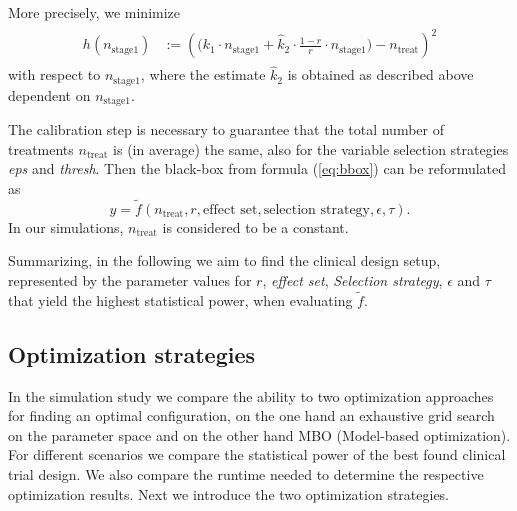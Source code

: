 \documentclass[bimj,fleqn]{w-art}
\theoremstyle{plain}
\theoremstyle{definition}
\begin{document}
More precisely, we minimize
\begin{align}
  \label{eq:targettreat}
  \begin{split}
  h(n_{\text{stage1}}) &:= \left( \Big(k_1 \cdot n_{\text{stage1}} + \hat{k}_2 \cdot %
  \frac{1-r}{r} \cdot n_{\text{stage1}}
  \Big) - n_{\text{treat}} \right)^2
  \end{split}
\end{align}
with respect to $n_{\text{stage1}}$, where the estimate $\hat{k}_2$ is obtained as described above dependent on $n_{\text{stage1}}$. 

The calibration step is necessary to guarantee that the total number of treatments $n_{\text{treat}}$ is (in average) the same, also for the variable selection strategies \emph{eps} and \emph{thresh}.
Then the black-box from formula (\ref{eq:bbox}) can be reformulated as 
\begin{equation}
  y = \tilde{f}(n_{\text{treat}}, r, \text{effect set}, \text{selection strategy}, \epsilon, \tau).
\end{equation}
In our simulations, $n_{\text{treat}}$ is considered to be a constant.

Summarizing, in the following we aim to find the clinical design setup, represented by the parameter values for $r$, \emph{effect set}, \emph{Selection strategy}, $\epsilon$ and $\tau$ that yield the highest statistical power, when evaluating $\tilde{f}$.

\subsection{Optimization strategies}

In the simulation study we compare the ability to two optimization approaches for finding an optimal configuration, on the one hand an exhaustive grid search on the parameter space and on the other hand  MBO (Model-based optimization).
For different scenarios we compare the statistical power of the best found clinical trial design.
We also compare the runtime needed to determine the respective optimization results.
Next we introduce the two optimization strategies.
\end{document}
